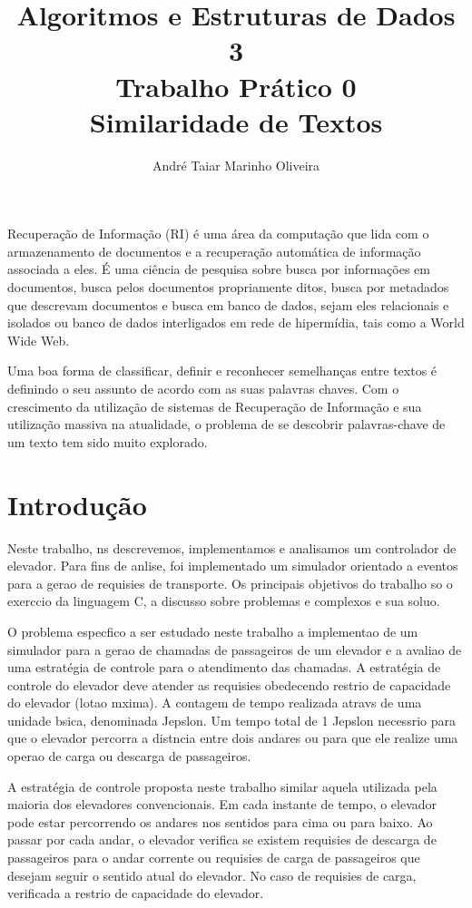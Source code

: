 \documentclass[12pt]{article}
\title{Algoritmos e Estruturas de Dados 3 \\ Trabalho Prático 0 \\
\huge{Similaridade de Textos}}
\author{André Taiar Marinho Oliveira}
\begin{document}
\maketitle

\begin{resumo}
Recuperação de Informação (RI) é uma área da computação  que lida com o armazenamento de documentos 
e a recuperação automática de informação associada a eles. É uma ciência de pesquisa sobre busca 
por informações em documentos, busca pelos documentos propriamente ditos, busca por metadados que 
descrevam documentos e busca em banco de dados, sejam eles relacionais e isolados ou banco de 
dados interligados em rede de hipermídia, tais como a World Wide Web.

Uma boa forma de classificar, definir e reconhecer semelhanças entre textos é definindo o
seu assunto de acordo com as suas palavras chaves. Com o crescimento da
utilização de sistemas de Recuperação de Informação e sua utilização massiva na
atualidade, o problema de se descobrir palavras-chave de um texto tem sido muito
explorado.
\end{resumo}

\section{Introdução}

Neste trabalho, ns descrevemos, implementamos e analisamos um controlador de elevador. 
Para fins de anlise, foi implementado um simulador orientado a eventos para a gerao 
de requisies de transporte. Os principais objetivos do trabalho so o exerccio da 
linguagem C, a discusso sobre problemas e complexos e sua soluo.

O problema especfico a ser estudado neste trabalho  a implementao de um simulador para 
a gerao de chamadas de passageiros de um elevador e a avaliao de uma estratégia de controle 
para o atendimento das chamadas. A estratégia de controle do elevador deve atender as requisies 
obedecendo  restrio de capacidade do elevador (lotao mxima). A contagem de tempo  realizada 
atravs de uma unidade bsica, denominada Jepslon. Um tempo total de 1 Jepslon  necessrio para 
que o elevador percorra a distncia entre dois andares ou para que ele realize uma operao de 
carga ou descarga de passageiros.

A estratégia de controle proposta neste trabalho  similar  aquela utilizada pela maioria dos 
elevadores convencionais. Em cada instante de tempo, o elevador pode estar percorrendo os 
andares nos sentidos para cima ou para baixo. Ao passar por cada andar, o elevador verifica 
se existem requisies de descarga de passageiros para o andar corrente ou requisies de carga 
de passageiros que desejam seguir o sentido atual do elevador. No caso de requisies de carga,  
verificada a restrio de capacidade do elevador.
\end{document}
